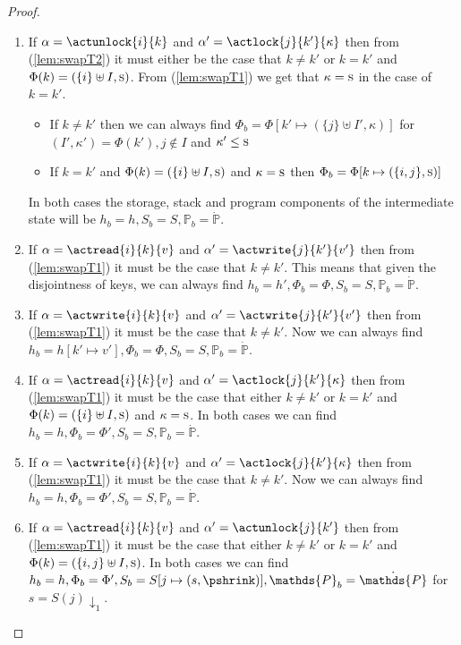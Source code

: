 \begin{lem}
\begin{proof}
\begin{enumerate}[label=({\roman*})]
		\item If $\alpha = \actunlock{i}{k}$ and $\alpha' = \actlock{j}{k'}{\kappa}$ then from (\ref{lem:swapT2}) it must either be the case that $k \neq k'$ or $k = k'$ and $\Phi(k) = (\{i\} \uplus I, \textsc{s})$. From (\ref{lem:swapT1}) we get that $\kappa = \textsc{s}$ in the case of $k = k'$.
		\begin{itemize}
			\item If $k \neq k'$ then we can always find $\Phi_b = \Phi[k' \mapsto (\{j\} \uplus I', \kappa)]$ for $(I', \kappa') = \Phi(k'), j \not\in I$ and $\kappa' \leq \textsc{s}$
			
			\item If $k = k'$ and $\Phi(k) = (\{i\} \uplus I, \textsc{s})$ and $\kappa = \textsc{s}$ then $\Phi_b = \Phi[k \mapsto (\{i, j\}, \textsc{s})]$
		\end{itemize}
		In both cases the storage, stack and program components of the intermediate state will be $h_b = h, S_b = S, \mathds{P}_b = \dot{\mathds{P}}$.
		
		\item If $\alpha = \actread{i}{k}{v}$ and $\alpha' = \actwrite{j}{k'}{v'}$ then from (\ref{lem:swapT1}) it must be the case that $k \neq k'$. This means that given the disjointness of keys, we can always find $h_b = h', \Phi_b = \Phi, S_b = S, \mathds{P}_b = \dot{\mathds{P}}$.
		
		\item If $\alpha = \actwrite{i}{k}{v}$ and $\alpha' = \actwrite{j}{k'}{v'}$ then from (\ref{lem:swapT1}) it must be the case that $k \neq k'$. Now we can always find $h_b = h[k' \mapsto v'], \Phi_b = \Phi, S_b = S, \mathds{P}_b = \dot{\mathds{P}}$.
		
		\item If $\alpha = \actread{i}{k}{v}$ and $\alpha' = \actlock{j}{k'}{\kappa}$ then from (\ref{lem:swapT1}) it must be the case that either $k \neq k'$ or $k = k'$ and $\Phi(k) = (\{i\} \uplus I, \textsc{s})$ and $\kappa = \textsc{s}$. In both cases we can find $h_b = h, \Phi_b = \Phi', S_b = S, \mathds{P}_b = \dot{\mathds{P}}$.
		
		\item If $\alpha = \actwrite{i}{k}{v}$ and $\alpha' = \actlock{j}{k'}{\kappa}$ then from (\ref{lem:swapT1}) it must be the case that $k \neq k'$. Now we can always find $h_b = h, \Phi_b = \Phi', S_b = S, \mathds{P}_b = \dot{\mathds{P}}$.
		
		\item If $\alpha = \actread{i}{k}{v}$ and $\alpha' = \actunlock{j}{k'}$ then from (\ref{lem:swapT1}) it must be the case that either $k \neq k'$ or $k = k'$ and $\Phi(k) = (\{i,j\} \uplus I, \textsc{s})$. In both cases we can find $h_b = h, \Phi_b = \Phi', S_b = S[j \mapsto (s, \pshrink)], \mathds{P}_b = \dot{\mathds{P}}$ for $s = S(j) \downarrow_1$.
		

\end{enumerate}
\end{proof}
\end{lem}
